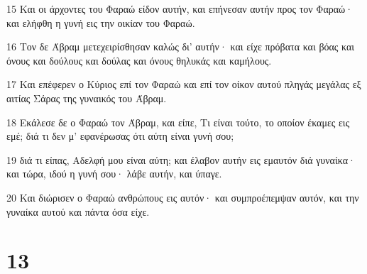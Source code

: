 \par 15 Και οι άρχοντες του Φαραώ είδον αυτήν, και επήνεσαν αυτήν προς τον Φαραώ· και ελήφθη η γυνή εις την οικίαν του Φαραώ.
\par 16 Τον δε Άβραμ μετεχειρίσθησαν καλώς δι' αυτήν· και είχε πρόβατα και βόας και όνους και δούλους και δούλας και όνους θηλυκάς και καμήλους.
\par 17 Και επέφερεν ο Κύριος επί τον Φαραώ και επί τον οίκον αυτού πληγάς μεγάλας εξ αιτίας Σάρας της γυναικός του Άβραμ.
\par 18 Εκάλεσε δε ο Φαραώ τον Άβραμ, και είπε, Τι είναι τούτο, το οποίον έκαμες εις εμέ; διά τι δεν μ' εφανέρωσας ότι αύτη είναι γυνή σου;
\par 19 διά τι είπας, Αδελφή μου είναι αύτη; και έλαβον αυτήν εις εμαυτόν διά γυναίκα· και τώρα, ιδού η γυνή σου· λάβε αυτήν, και ύπαγε.
\par 20 Και διώρισεν ο Φαραώ ανθρώπους εις αυτόν· και συμπροέπεμψαν αυτόν, και την γυναίκα αυτού και πάντα όσα είχε.

\chapter{13}

